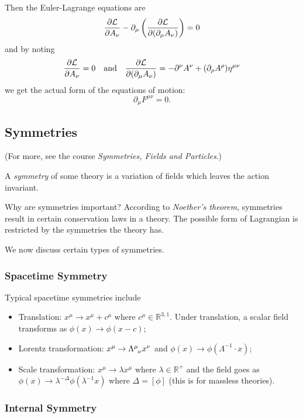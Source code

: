 \documentclass[a4paper,11pt]{article}
\begin{document}
	Then the Euler-Lagrange equations are
	\[
		\pdv{\mathcal{L}}{A_\nu} - \partial_\mu \left( \pdv{\mathcal{L}}{(\partial_\mu A_\nu)} \right) = 0
	\]
	and by noting
	\[
		\pdv{\mathcal{L}}{A_\nu} = 0 \quad \text{and} \quad \pdv{\mathcal{L}}{(\partial_\mu A_\nu)} = - \partial^\nu A^\nu + (\partial_\rho A^\rho)\eta^{\mu\nu}
	\]
	we get the actual form of the equations of motion:
	\begin{equation}
		\partial_\mu F^{\mu\nu} = 0.
	\end{equation}

	\subsection{Symmetries}
	(For more, see the course \emph{Symmetries, Fields and Particles}.)
	\begin{defi}
		A \emph{symmetry} of some theory is a variation of fields which leaves the action invariant.
	\end{defi}

	Why are symmetries important? According to \emph{Noether's theorem}, symmetries result in certain conservation laws in a theory. The possible form of Lagrangian is restricted by the symmetries the theory has.

	We now discuss certain types of symmetries.

	\subsubsection{Spacetime Symmetry}
	Typical spacetime symmetries include
	\begin{itemize}
		\item Translation: $x^\mu \to x^\mu + c^\mu$ where $c^\mu \in \mathbb{R}^{3,1}$. Under translation, a scalar field transforms as $\phi(x) \to \phi(x-c)$; 
		\item Lorentz transformation: $x^\mu \to \LT{\mu}{\nu}x^\nu$ and $\phi(x) \to \phi(\Lambda^{-1} \cdot x)$;
		\item Scale transformation: $x^\mu \to \lambda x^\mu$ where $\lambda \in \mathbb{R}^+$ and the field goes as $\phi(x) \to \lambda^{-\Delta}\phi(\lambda^{-1} x)$ where $\Delta = [\phi]$ (this is for massless theories). 
	\end{itemize}

	\subsubsection{Internal Symmetry}
\end{document}

